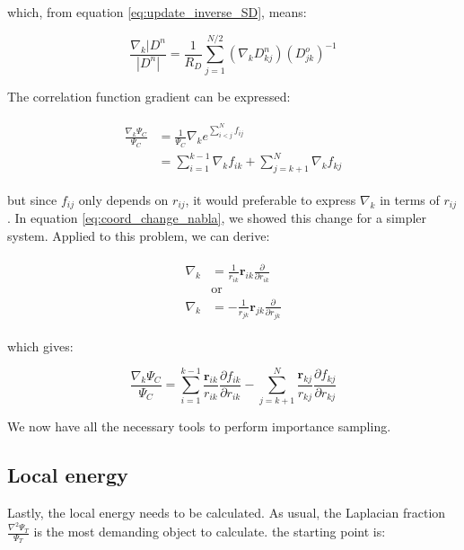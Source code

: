 \documentclass[english, a4paper]{article}
\newcommand{\bm}[1]{\mathbf{#1}}
\begin{document}
	which, from equation \ref{eq:update_inverse_SD}, means:
	
	\begin{equation}
	\frac{\nabla_k|D^n}{|D^n|} = \frac{1}{R_D}\sum_{j=1}^{N/2}(\nabla_kD_{kj}^n)(D_{jk}^o)^{-1}
	\end{equation}
	
	The correlation function gradient can be expressed:
	
	\begin{align}
	\begin{split}
	\frac{\nabla_k \Psi_C}{\Psi_C} &= \frac{1}{\Psi_C}\nabla_k e^{\sum_{i<j}^Nf_{ij}}\\
	&= \sum_{i=1}^{k-1}\nabla_kf_{ik} + \sum_{j=k+1}^{N}\nabla_kf_{kj}
	\end{split}
	\end{align}
	
	but since $f_{ij}$ only depends on $r_{ij}$, it would preferable to express $\nabla_k$ in terms of $r_{ij}$. In equation \ref{eq:coord_change_nabla}, we showed this change for a simpler system. Applied to this problem, we can derive:
	
	\begin{align}
	\begin{split}
	\nabla_k &=  \frac{1}{r_{ik}}\bm{r}_{ik}\frac{\partial}{\partial r_{ik}}\\
	&\text{or}\\
	\nabla_k &=  -\frac{1}{r_{jk}}\bm{r}_{jk}\frac{\partial}{\partial r_{jk}}
	\end{split}
	\end{align}
	
	which gives:
	
	\begin{equation}
	\frac{\nabla_k \Psi_C}{\Psi_C} = \sum_{i=1}^{k-1}\frac{\bm{r}_{ik}}{r_{ik}}\frac{\partial f_{ik}}{\partial r_{ik}} - \sum_{j=k+1}^{N}\frac{\bm{r}_{kj}}{r_{kj}}\frac{\partial f_{kj}}{\partial r_{kj}}
	\end{equation}
	
	We now have all the necessary tools to perform importance sampling.
	
	\subsection{Local energy}
	Lastly, the local energy needs to be calculated. As usual, the Laplacian fraction $\frac{\nabla^2\Psi_T}{\Psi_T}$ is the most demanding object to calculate. the starting point is:
	
\end{document}
